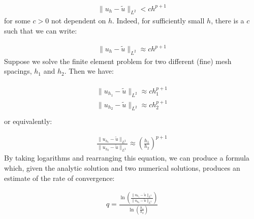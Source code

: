 \documentclass{book}
\begin{document}
\label{\detokenize{6_finite_element_problems:equation-6_finite_element_problems:14}}\begin{equation}\label{equation:6_finite_element_problems:6_finite_element_problems:14}
\begin{split}\|u_h - \tilde{u}\|_{L^2} < c h^{p+1}\end{split}
\end{equation}
for some \(c>0\) not dependent on \(h\). Indeed, for sufficiently small
\(h\), there is a \(c\) such that we can write:

\label{\detokenize{6_finite_element_problems:equation-6_finite_element_problems:15}}\begin{equation}\label{equation:6_finite_element_problems:6_finite_element_problems:15}
\begin{split}\|u_h - \tilde{u}\|_{L^2} \approx c h^{p+1}\end{split}
\end{equation}
Suppose we solve the finite element problem for two different (fine)
mesh spacings, \(h_1\) and \(h_2\). Then we have:

\label{\detokenize{6_finite_element_problems:equation-6_finite_element_problems:16}}\begin{align}\label{equation:6_finite_element_problems:6_finite_element_problems:16}\!\begin{aligned}
\|u_{h_1} - \tilde{u}\|_{L^2} \approx c h_1^{p+1}\\
\|u_{h_2} - \tilde{u}\|_{L^2} \approx c h_2^{p+1}\\
\end{aligned}\end{align}
or equivalently:

\label{\detokenize{6_finite_element_problems:equation-6_finite_element_problems:17}}\begin{equation}\label{equation:6_finite_element_problems:6_finite_element_problems:17}
\begin{split}\frac{\|u_{h_1} - \tilde{u}\|_{L^2}}{\|u_{h_2} - \tilde{u}\|_{L^2}}
\approx \left(\frac{h_1}{h_2}\right)^{p+1}\end{split}
\end{equation}
By taking logarithms and rearranging this equation, we can produce a
formula which, given the analytic solution and two numerical
solutions, produces an estimate of the rate of convergence:

\label{\detokenize{6_finite_element_problems:equation-6_finite_element_problems:18}}\begin{equation}\label{equation:6_finite_element_problems:6_finite_element_problems:18}
\begin{split}q = \frac{\ln\left(\displaystyle\frac{\|u_{h_1} - \tilde{u}\|_{L^2}}{\|u_{h_2} - \tilde{u}\|_{L^2}}\right)}
{\ln\left(\displaystyle\frac{h_1}{h_2}\right)}\end{split}
\end{equation}
\end{document}
